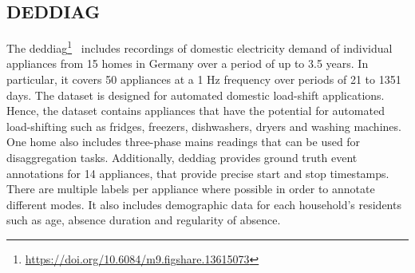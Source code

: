 \newpage

\subsection{DEDDIAG}

The \acrlong{deddiag}\footnote{\url{https://doi.org/10.6084/m9.figshare.13615073}}~\parencite{wenninger_deddiag_2021} includes recordings of domestic electricity demand of individual appliances from 15 homes in Germany over a period of up to 3.5 years. In particular, it covers 50 appliances at a 1 Hz frequency over periods of 21 to 1351 days. The dataset is designed for automated domestic load-shift applications. Hence, the dataset contains appliances that have the potential for automated load-shifting such as fridges, freezers, dishwashers, dryers and washing machines. One home also includes three-phase mains readings that can be used for disaggregation tasks. Additionally, \acrshort{deddiag} provides ground truth event annotations for 14 appliances, that provide precise start and stop timestamps. There are multiple labels per appliance where possible in order to annotate different modes. It also includes demographic data for each household's residents such as age, absence duration and regularity of absence.

